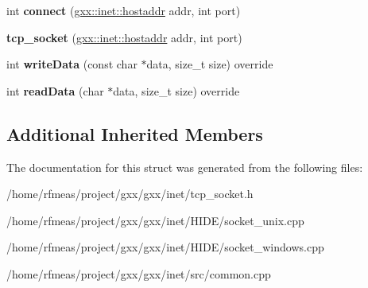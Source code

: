 \begin{DoxyCompactItemize}
\item 
int {\bfseries connect} (\hyperlink{classgxx_1_1hostaddr}{gxx\+::inet\+::hostaddr} addr, int port)\hypertarget{structgxx_1_1inet_1_1tcp__socket_a679fc13e82a785a93df8fefab0c0f627}{}\label{structgxx_1_1inet_1_1tcp__socket_a679fc13e82a785a93df8fefab0c0f627}

\item 
{\bfseries tcp\+\_\+socket} (\hyperlink{classgxx_1_1hostaddr}{gxx\+::inet\+::hostaddr} addr, int port)\hypertarget{structgxx_1_1inet_1_1tcp__socket_af2678df2a3fdf89bb3809dc09106b5fc}{}\label{structgxx_1_1inet_1_1tcp__socket_af2678df2a3fdf89bb3809dc09106b5fc}

\item 
int {\bfseries write\+Data} (const char $\ast$data, size\+\_\+t size) override\hypertarget{structgxx_1_1inet_1_1tcp__socket_ab41c506bedec52aee782a4436fc31edb}{}\label{structgxx_1_1inet_1_1tcp__socket_ab41c506bedec52aee782a4436fc31edb}

\item 
int {\bfseries read\+Data} (char $\ast$data, size\+\_\+t size) override\hypertarget{structgxx_1_1inet_1_1tcp__socket_a502a3777323ae8530a5ec3dc7b24dd41}{}\label{structgxx_1_1inet_1_1tcp__socket_a502a3777323ae8530a5ec3dc7b24dd41}

\end{DoxyCompactItemize}
\subsection*{Additional Inherited Members}


The documentation for this struct was generated from the following files\+:\begin{DoxyCompactItemize}
\item 
/home/rfmeas/project/gxx/gxx/inet/tcp\+\_\+socket.\+h\item 
/home/rfmeas/project/gxx/gxx/inet/\+H\+I\+D\+E/socket\+\_\+unix.\+cpp\item 
/home/rfmeas/project/gxx/gxx/inet/\+H\+I\+D\+E/socket\+\_\+windows.\+cpp\item 
/home/rfmeas/project/gxx/gxx/inet/src/common.\+cpp\end{DoxyCompactItemize}
